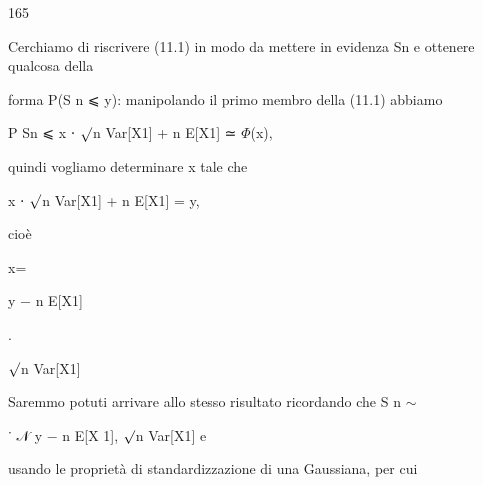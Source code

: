 \documentclass[a4paper,portrait,12pt]{article}
\begin{document}
165





\begin{flushleft}
Cerchiamo di riscrivere (11.1) in modo da mettere in evidenza Sn e ottenere qualcosa della
\end{flushleft}


\begin{flushleft}
forma P(S n ⩽ y): manipolando il primo membro della (11.1) abbiamo
\end{flushleft}


\begin{flushleft}
P Sn ⩽ x ⋅ $\surd$n Var[X1] + n E[X1] ≃ $\Phi$(x),
\end{flushleft}


\begin{flushleft}
quindi vogliamo determinare x tale che
\end{flushleft}


\begin{flushleft}
x ⋅ $\surd$n Var[X1] + n E[X1] = y,
\end{flushleft}


\begin{flushleft}
cio\`{e}
\end{flushleft}


\begin{flushleft}
x=
\end{flushleft}





\begin{flushleft}
y $-$ n E[X1]
\end{flushleft}


.


\begin{flushleft}
$\surd$n Var[X1]
\end{flushleft}





\begin{flushleft}
Saremmo potuti arrivare allo stesso risultato ricordando che S n $\sim$
\end{flushleft}


\begin{flushleft}
˙ 𝒩 y $-$ n E[X 1], $\surd$n Var[X1] e
\end{flushleft}


\begin{flushleft}
usando le propriet\`{a} di standardizzazione di una Gaussiana, per cui
\end{flushleft}
\end{document}
